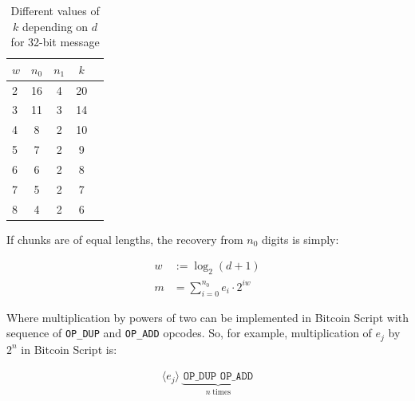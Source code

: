 \documentclass{iacrtrans}
\newcommand{\elem}[1]{\, \langle #1 \rangle \,}
\newcommand{\opcode}[1]{\, \texttt{#1} \,}
\begin{document}

\begin{table}[h]
  \centering
  \begin{tabular}{lcccc}
    \toprule
    $w$ & $n_0$ & $n_1$ & $k$ \\
    \midrule
    2 & 16 & 4 & 20 \\
    3 & 11 & 3 & 14 \\
    4 & 8 & 2 & 10 \\
    5 & 7 & 2 & 9 \\
    6 & 6 & 2 & 8 \\
    7 & 5 & 2 & 7 \\
    8 & 4 & 2 & 6 \\
    \bottomrule
  \end{tabular}
  \caption{Different values of $k$ depending on $d$ for 32-bit
  message}\label{tab:winternitz}
\end{table}

If chunks are of equal lengths, the recovery from $n_0$ digits is
simply:

\begin{equation}
  \begin{aligned}
    w &:= \log_2{(d+1)} \\
    m &= \sum_{i = 0}^{n_0} e_i \cdot 2^{i w}
  \end{aligned}
  \label{eq:u32-recovery}
\end{equation}

Where multiplication by powers of two can be implemented in Bitcoin
Script with sequence of \texttt{OP\_DUP} and \texttt{OP\_ADD}
opcodes. So, for example, multiplication of $e_j$ by $2^n$ in Bitcoin
Script is:

\begin{empheqboxed}
  \begin{align*}
    \elem{e_j} \underbrace{\opcode{OP\_DUP} \opcode{OP\_ADD}}_{n \; \text{times}}
  \end{align*}
\end{empheqboxed}
\end{document}
